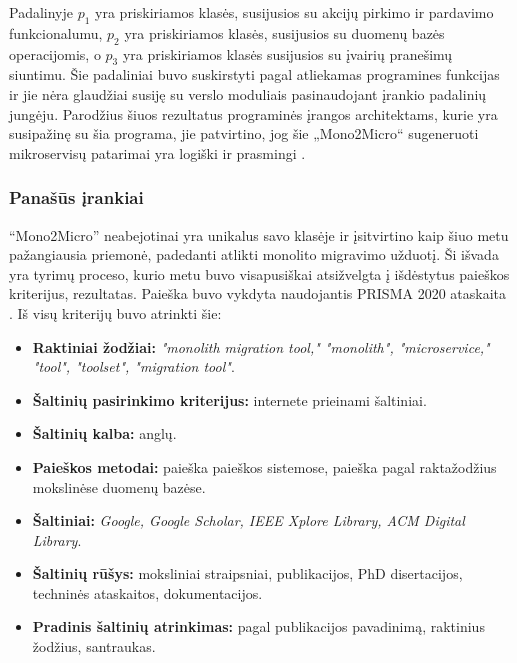 \documentclass{VUMIFPSbakalaurinis}
\begin{document}
Padalinyje $p_{1}$ yra priskiriamos klasės, susijusios su akcijų pirkimo ir pardavimo funkcionalumu, $p_{2}$ yra priskiriamos klasės, susijusios su duomenų bazės operacijomis, o $p_{3}$ yra priskiriamos klasės susijusios su įvairių pranešimų siuntimu. Šie padaliniai buvo suskirstyti pagal atliekamas programines funkcijas ir jie nėra glaudžiai susiję su verslo moduliais pasinaudojant įrankio padalinių jungėju. Parodžius šiuos rezultatus programinės įrangos architektams, kurie yra susipažinę su šia programa, jie patvirtino, jog šie „Mono2Micro“ sugeneruoti mikroservisų patarimai yra logiški ir prasmingi \cite{KXL+20}.

\subsubsection{Panašūs įrankiai}
\enquote{Mono2Micro} neabejotinai yra unikalus savo klasėje ir įsitvirtino kaip šiuo metu pažangiausia priemonė, padedanti atlikti monolito migravimo užduotį. Ši išvada yra tyrimų proceso, kurio metu buvo visapusiškai atsižvelgta į išdėstytus paieškos kriterijus, rezultatas. Paieška buvo vykdyta naudojantis PRISMA 2020 ataskaita \cite{Moherb2535}. Iš visų kriterijų buvo atrinkti šie: 

\begin{itemize}

    \item \textbf{Raktiniai žodžiai:} \emph{"monolith migration tool," "monolith", "microservice," "tool", "toolset", "migration tool"}.

    \item \textbf{Šaltinių pasirinkimo kriterijus:} internete prieinami šaltiniai.

    \item \textbf{Šaltinių kalba:} anglų.

    \item \textbf{Paieškos metodai:} paieška paieškos sistemose, paieška pagal raktažodžius mokslinėse duomenų bazėse.

    \item \textbf{Šaltiniai:} \emph{Google, Google Scholar, IEEE Xplore Library, ACM Digital Library}.

    \item \textbf{Šaltinių rūšys:} moksliniai straipsniai, publikacijos, PhD disertacijos, techninės ataskaitos, dokumentacijos.

    \item \textbf{Pradinis šaltinių atrinkimas:} pagal publikacijos pavadinimą, raktinius žodžius, santraukas.
    
\end{itemize}
\end{document}
